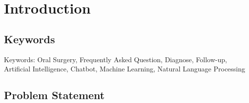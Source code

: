 \documentclass[12pt,oneside,openright,a4paper]{cpe-english-project}
\begin{document}



\chapter{Introduction}
  \section{Keywords}
    \qquad Keywords: Oral Surgery, Frequently Asked Question, Diagnose, Follow-up, Artificial Intelligence, Chatbot, Machine Learning, Natural Language Processing

  \section{Problem Statement}
\end{document}
